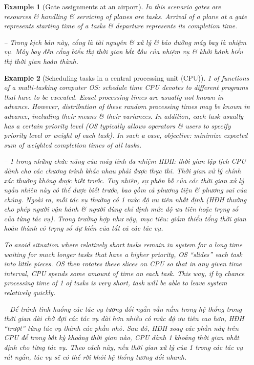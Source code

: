 \documentclass{article}
\newtheorem{example}{Example}
\begin{document}
\begin{itemize}
\begin{itemize}
\begin{example}[Gate assignments at an airport]
            In this scenario gates are resources \& handling \& servicing of planes are tasks. Arrival of a plane at a gate represents starting time of a tasks \& departure represents its completion time.

            -- Trong kịch bản này, cổng là tài nguyên \& xử lý \& bảo dưỡng máy bay là nhiệm vụ. Máy bay đến cổng biểu thị thời gian bắt đầu của nhiệm vụ \& khởi hành biểu thị thời gian hoàn thành.
        \end{example}

        \begin{example}[Scheduling tasks in a central processing unit (CPU)]
            1 of functions of a multi-tasking computer OS: schedule time CPU devotes to different programs that have to be executed. Exact processing times are usually not known in advance. However, distribution of these random processing times may be known in advance, including their means \& their variances. In addition, each task usually has a certain priority level (OS typically allows operators \& users to specify priority level or weight of each task). In such a case, objective: minimize expected sum of weighted completion times of all tasks.

            -- 1 trong những chức năng của máy tính đa nhiệm HĐH: thời gian lập lịch CPU dành cho các chương trình khác nhau phải được thực thi. Thời gian xử lý chính xác thường không được biết trước. Tuy nhiên, sự phân bố của các thời gian xử lý ngẫu nhiên này có thể được biết trước, bao gồm cả phương tiện \& phương sai của chúng. Ngoài ra, mỗi tác vụ thường có 1 mức độ ưu tiên nhất định (HĐH thường cho phép người vận hành \& người dùng chỉ định mức độ ưu tiên hoặc trọng số của từng tác vụ). Trong trường hợp như vậy, mục tiêu: giảm thiểu tổng thời gian hoàn thành có trọng số dự kiến của tất cả các tác vụ.

            To avoid situation where relatively short tasks remain in system for a long time waiting for much longer tasks that have a higher priority, OS ``slides'' each task into little pieces. OS then rotates these slices on CPU so that in any given time interval, CPU spends some amount of time on each task. This way, if by chance processing time of 1 of tasks is very short, task will be able to leave system relatively quickly.

            -- Để tránh tình huống các tác vụ tương đối ngắn vẫn nằm trong hệ thống trong thời gian dài chờ đợi các tác vụ dài hơn nhiều có mức độ ưu tiên cao hơn, HĐH ``trượt'' từng tác vụ thành các phần nhỏ. Sau đó, HĐH xoay các phần này trên CPU để trong bất kỳ khoảng thời gian nào, CPU dành 1 khoảng thời gian nhất định cho từng tác vụ. Theo cách này, nếu thời gian xử lý của 1 trong các tác vụ rất ngắn, tác vụ sẽ có thể rời khỏi hệ thống tương đối nhanh.


\end{example}
\end{itemize}
\end{itemize}
\end{document}
